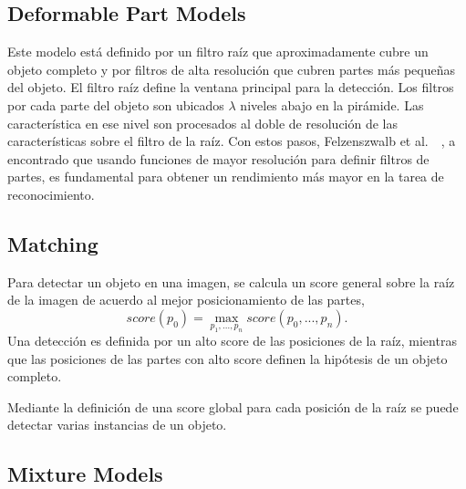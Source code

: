 \subsection{Deformable Part Models}
\label{subsec:dpm}
Este modelo está definido por un filtro raíz que aproximadamente cubre un objeto completo y por filtros de alta resolución que cubren partes más pequeñas del objeto. El filtro raíz define la ventana principal para la detección. Los filtros por cada parte del objeto son ubicados $\lambda$ niveles abajo en la pirámide. Las característica en ese nivel son procesados al doble de resolución de las características sobre el filtro de la raíz.
Con estos pasos, Felzenszwalb et al.~\cite{Felzenszwalb2010}~\cite{Felzenszwalb2013}, a encontrado que usando funciones de mayor resolución para definir filtros de partes, es fundamental para obtener un rendimiento más mayor en la tarea de reconocimiento.

\subsection{Matching}
\label{subsec:matching}
Para detectar un objeto en una imagen, se calcula un score general sobre la raíz de la imagen de acuerdo al mejor posicionamiento de las partes, 
\begin{equation}
	score(p_{0}) = \max_{p_{1}, ..., p_{n}} score(p_{0}, ..., p_{n}).
\end{equation} 
Una detección es definida por un alto score de las posiciones de la raíz, mientras que las posiciones de las partes con alto score definen la hipótesis de un objeto completo.

Mediante la definición de una score global para cada posición de la raíz se puede detectar varias instancias de un objeto.

\subsection{Mixture Models}
\label{subsec:mm}
